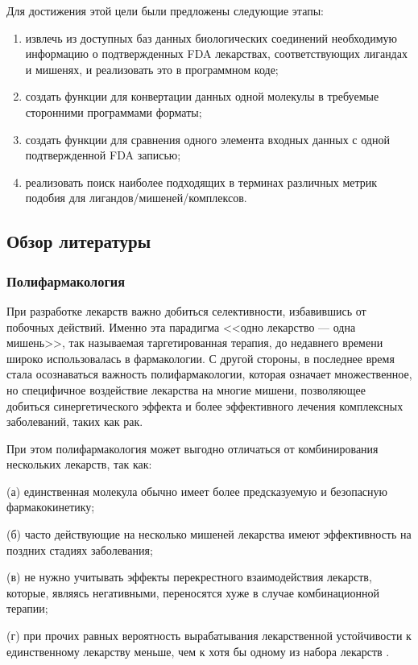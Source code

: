 \documentclass[a4paper,14pt]{article}         %
\begin{document}
Для достижения этой цели были предложены следующие этапы:
\begin{enumerate}
	\item извлечь из доступных баз данных биологических соединений необходимую информацию о подтвержденных FDA лекарствах, соответствующих лигандах и мишенях, и реализовать это в программном коде;
	\item создать функции для конвертации данных одной молекулы в требуемые сторонними программами форматы;
	\item создать функции для сравнения одного элемента входных данных с одной подтвержденной FDA записью;
	\item реализовать поиск наиболее подходящих в терминах различных метрик подобия для лигандов/мишеней/комплексов.
\end{enumerate}

\subsection{Обзор литературы}
\subsubsection{Полифармакология}
При разработке лекарств важно добиться селективности, избавившись от побочных действий. Именно эта парадигма <<одно лекарство --- одна мишень>>, так называемая таргетированная терапия, до недавнего времени широко использовалась в фармакологии. С другой стороны, в последнее время стала осознаваться важность полифармакологии, которая означает множественное, но специфичное воздействие лекарства на многие мишени, позволяющее добиться синергетического эффекта и более эффективного лечения комплексных заболеваний, таких как рак\cite{Anighoro2014}. 

При этом полифармакология может выгодно отличаться от комбинирования нескольких лекарств, так как:

(а) единственная молекула обычно имеет более предсказуемую и безо\-пасную фармакокинетику; 

(б) часто действующие на несколько мишеней лекарства имеют  эффективность на поздних стадиях заболевания; 

(в) не нужно учитывать эффекты перекрестного взаимодействия лекарств, которые, являясь негативными, переносятся хуже в случае комбинационной терапии; 

(г) при прочих равных  вероятность вырабатывания лекарственной устойчивости к единственному лекарству меньше, чем к хотя бы одному из набора лекарств \cite{Anighoro2014}.
\end{document}
